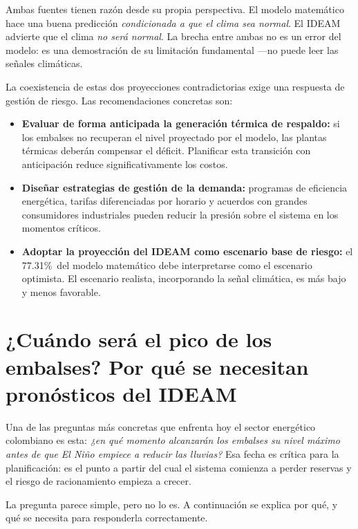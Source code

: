 \documentclass[11pt,a4paper]{article}
\newcommand{\PREDAGOSTO}{77.31\%}
\begin{document}
Ambas fuentes tienen razón desde su propia perspectiva. El modelo matemático hace una buena predicción \textit{condicionada a que el clima sea normal}. El IDEAM advierte que el clima \textit{no será normal}. La brecha entre ambas no es un error del modelo: es una demostración de su limitación fundamental ---no puede leer las señales climáticas.

\begin{alertbox}
La coexistencia de estas dos proyecciones contradictorias exige una respuesta de gestión de riesgo. Las recomendaciones concretas son:
\begin{itemize}[noitemsep,leftmargin=*]
\item \textbf{Evaluar de forma anticipada la generación térmica de respaldo:} si los embalses no recuperan el nivel proyectado por el modelo, las plantas térmicas deberán compensar el déficit. Planificar esta transición con anticipación reduce significativamente los costos.
\item \textbf{Diseñar estrategias de gestión de la demanda:} programas de eficiencia energética, tarifas diferenciadas por horario y acuerdos con grandes consumidores industriales pueden reducir la presión sobre el sistema en los momentos críticos.
\item \textbf{Adoptar la proyección del IDEAM como escenario base de riesgo:} el \PREDAGOSTO\ del modelo matemático debe interpretarse como el escenario optimista. El escenario realista, incorporando la señal climática, es más bajo y menos favorable.
\end{itemize}
\end{alertbox}

\section{¿Cuándo será el pico de los embalses? Por qué se necesitan pronósticos del IDEAM}

Una de las preguntas más concretas que enfrenta hoy el sector energético colombiano es esta: \textit{¿en qué momento alcanzarán los embalses su nivel máximo antes de que El Niño empiece a reducir las lluvias?} Esa fecha es crítica para la planificación: es el punto a partir del cual el sistema comienza a perder reservas y el riesgo de racionamiento empieza a crecer.

La pregunta parece simple, pero no lo es. A continuación se explica por qué, y qué se necesita para responderla correctamente.
\end{document}

